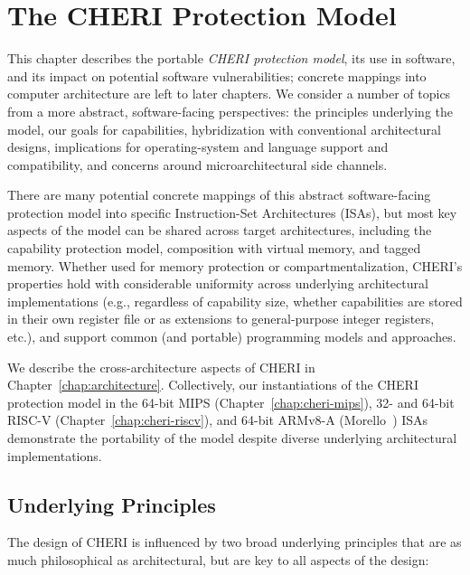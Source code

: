 \chapter{The CHERI Protection Model}
\label{chap:model}

This chapter describes the portable \textit{CHERI protection model}, its use
in software, and its impact on potential software vulnerabilities; concrete
mappings into computer architecture are left to later chapters.
We consider a number of topics from a more abstract, software-facing
perspectives: the principles underlying the model, our goals for capabilities,
hybridization with conventional architectural designs, implications for
operating-system and language support and compatibility, and concerns around
microarchitectural side channels.

There are many potential concrete mappings of this abstract software-facing
protection model into specific Instruction-Set Architectures (ISAs), but most
key aspects of the model can be shared across target architectures, including
the capability protection model, composition with virtual memory, and tagged
memory.
Whether used for memory protection or compartmentalization, CHERI's properties
hold with considerable uniformity across underlying architectural
implementations (e.g., regardless of capability size, whether capabilities are
stored in their own register file or as extensions to general-purpose integer
registers, etc.), and support common (and portable) programming
models and approaches.

We describe the cross-architecture aspects of CHERI in
Chapter~\ref{chap:architecture}.
Collectively, our instantiations of the CHERI protection model in the 64-bit
MIPS (Chapter~\ref{chap:cheri-mips}), 32- and 64-bit RISC-V
(Chapter~\ref{chap:cheri-riscv}), and 64-bit ARMv8-A
(Morello~\cite{arm-morello}) ISAs
demonstrate the portability of the model despite diverse underlying
architectural implementations.

\section{Underlying Principles}

The design of CHERI is influenced by two broad underlying principles that are
as much philosophical as architectural, but are key to all aspects of the
design:

